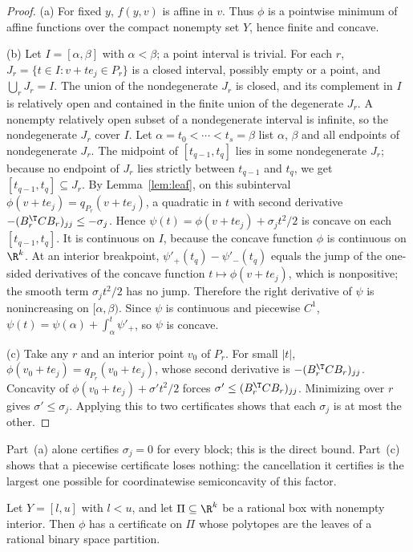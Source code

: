 \begin{proof}
(a) For fixed $y$, $f(y,v)$ is affine in $v$. Thus $\phi$ is a pointwise
minimum of affine functions over the compact nonempty set $Y$, hence finite
and concave.

(b) Let $I=[\alpha,\beta]$ with $\alpha<\beta$; a point interval is trivial.
For each $r$, $J_r=\{t\in I:v+te_j\in P_r\}$ is a closed interval, possibly
empty or a point, and $\bigcup_rJ_r=I$. The union of the nondegenerate $J_r$
is closed, and its complement in $I$ is relatively open and contained in the
finite union of the degenerate $J_r$. A nonempty relatively open subset of a
nondegenerate interval is infinite, so the nondegenerate $J_r$ cover $I$. Let
$\alpha=t_0<\cdots<t_s=\beta$ list $\alpha$, $\beta$ and all endpoints of
nondegenerate $J_r$. The midpoint of $[t_{q-1},t_q]$ lies in some nondegenerate
$J_r$; because no endpoint of $J_r$ lies strictly between $t_{q-1}$ and $t_q$,
we get $[t_{q-1},t_q]\subseteq J_r$. By Lemma~\ref{lem:leaf}, on this subinterval
$\phi(v+te_j)=q_{P_r}(v+te_j)$, a quadratic in $t$ with second derivative
$-(B_r^{\T}CB_r)_{jj}\le-\sigma_j$. Hence
$\psi(t)=\phi(v+te_j)+\sigma_jt^2/2$ is concave on each $[t_{q-1},t_q]$. It is
continuous on $I$, because the concave function $\phi$ is continuous on $\R^k$.
At an interior breakpoint, $\psi'_+(t_q)-\psi'_-(t_q)$ equals the jump of the
one-sided derivatives of the concave function $t\mapsto\phi(v+te_j)$, which is
nonpositive; the smooth term $\sigma_jt^2/2$ has no jump. Therefore the right
derivative of $\psi$ is nonincreasing on $[\alpha,\beta)$. Since $\psi$ is
continuous and piecewise $C^1$, $\psi(t)=\psi(\alpha)+\int_\alpha^t\psi'_+$, so
$\psi$ is concave.

(c) Take any $r$ and an interior point $v_0$ of $P_r$. For small $|t|$,
$\phi(v_0+te_j)=q_{P_r}(v_0+te_j)$, whose second derivative is
$-(B_r^{\T}CB_r)_{jj}$. Concavity of $\phi(v_0+te_j)+\sigma't^2/2$ forces
$\sigma'\le(B_r^{\T}CB_r)_{jj}$. Minimizing over $r$ gives
$\sigma'\le\sigma_j$. Applying this to two certificates shows that each
$\sigma_j$ is at most the other.
\end{proof}

Part~(a) alone certifies $\sigma_j=0$ for every block; this is the direct
bound. Part~(c) shows that a piecewise certificate loses nothing: the
cancellation it certifies is the largest one possible for coordinatewise
semiconcavity of this factor.

\begin{proposition}\label{prop:cert-exist}
Let $Y=[l,u]$ with $l<u$, and let $\Pi\subseteq\R^k$ be a rational box with
nonempty interior. Then $\phi$ has a certificate on $\Pi$ whose polytopes are
the leaves of a rational binary space partition.
\end{proposition}

